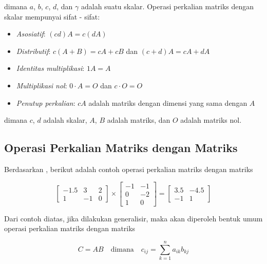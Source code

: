 \noindent
dimana $a$, $b$, $c$, $d$, dan $\gamma$ adalah suatu skalar. Operasi perkalian matriks
dengan skalar mempunyai sifat - sifat:

\begin{itemize}
  \item \emph{Asosiatif}: $(cd) A = c (dA)$

  \item \emph{Distributif}: $c(A+B)=cA+cB$ dan $(c+d)A=cA+dA$

  \item \emph{Identitas multiplikasi}: $1 A = A$

  \item \emph{Multiplikasi nol}: $0\cdot A=O$ dan $c\cdot O= O$

  \item \emph{Penutup perkalian}: $cA$ adalah matriks dengan dimensi yang sama dengan
    $A$
\end{itemize}

\noindent
dimana $c$, $d$ adalah skalar, $A$, $B$ adalah matriks, dan $O$ adalah matriks
nol.

\subsection{Operasi Perkalian Matriks dengan Matriks}

Berdasarkan \cite{boydIntroductionAppliedLinear2018}, berikut adalah contoh
operasi perkalian matriks dengan matriks

\[
  \begin{bmatrix}
    -1.5 & 3  & 2 \\
    1    & -1 & 0
  \end{bmatrix}
  \times
  \begin{bmatrix}
    -1 & -1 \\
    0  & -2 \\
    1  & 0
  \end{bmatrix}
  =
  \begin{bmatrix}
    3.5 & -4.5 \\
    -1  & 1
  \end{bmatrix}
\]

\noindent
Dari contoh diatas, jika dilakukan generalisir, maka akan diperoleh bentuk umum
operasi perkalian matriks dengan matriks

\begin{equation}
  \label{eq:matrix_mult_matrix}C = AB \quad \text{dimana}\quad c_{ij}= \sum_{k=1}
  ^{n}a_{ik}b_{kj}
\end{equation}

